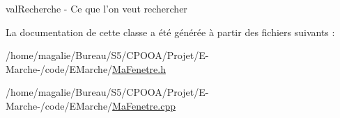 val\-Recherche -\/ Ce que l'on veut rechercher 



La documentation de cette classe a été générée à partir des fichiers suivants \-:\begin{DoxyCompactItemize}
\item 
/home/magalie/\-Bureau/\-S5/\-C\-P\-O\-O\-A/\-Projet/\-E-\/\-Marche-\//code/\-E\-Marche/\hyperlink{_ma_fenetre_8h}{Ma\-Fenetre.\-h}\item 
/home/magalie/\-Bureau/\-S5/\-C\-P\-O\-O\-A/\-Projet/\-E-\/\-Marche-\//code/\-E\-Marche/\hyperlink{_ma_fenetre_8cpp}{Ma\-Fenetre.\-cpp}\end{DoxyCompactItemize}
